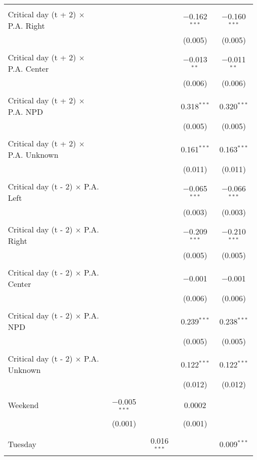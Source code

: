 \documentclass[
]{article}
\begin{document}
\begin{table}[!htbp]
{\begin{tabular}{@{\extracolsep{5pt}}lcccc}
  & & & & \\ 
 Critical day (t + 2) $\times$ P.A. Right &  &  & $-$0.162$^{***}$ & $-$0.160$^{***}$ \\ 
  &  &  & (0.005) & (0.005) \\ 
  & & & & \\ 
 Critical day (t + 2) $\times$ P.A. Center &  &  & $-$0.013$^{**}$ & $-$0.011$^{**}$ \\ 
  &  &  & (0.006) & (0.006) \\ 
  & & & & \\ 
 Critical day (t + 2) $\times$ P.A. NPD &  &  & 0.318$^{***}$ & 0.320$^{***}$ \\ 
  &  &  & (0.005) & (0.005) \\ 
  & & & & \\ 
 Critical day (t + 2) $\times$ P.A. Unknown &  &  & 0.161$^{***}$ & 0.163$^{***}$ \\ 
  &  &  & (0.011) & (0.011) \\ 
  & & & & \\ 
 Critical day (t - 2) $\times$ P.A. Left &  &  & $-$0.065$^{***}$ & $-$0.066$^{***}$ \\ 
  &  &  & (0.003) & (0.003) \\ 
  & & & & \\ 
 Critical day (t - 2) $\times$ P.A. Right &  &  & $-$0.209$^{***}$ & $-$0.210$^{***}$ \\ 
  &  &  & (0.005) & (0.005) \\ 
  & & & & \\ 
 Critical day (t - 2) $\times$ P.A. Center &  &  & $-$0.001 & $-$0.001 \\ 
  &  &  & (0.006) & (0.006) \\ 
  & & & & \\ 
 Critical day (t - 2) $\times$ P.A. NPD &  &  & 0.239$^{***}$ & 0.238$^{***}$ \\ 
  &  &  & (0.005) & (0.005) \\ 
  & & & & \\ 
 Critical day (t - 2) $\times$ P.A. Unknown &  &  & 0.122$^{***}$ & 0.122$^{***}$ \\ 
  &  &  & (0.012) & (0.012) \\ 
  & & & & \\ 
 Weekend & $-$0.005$^{***}$ &  & 0.0002 &  \\ 
  & (0.001) &  & (0.001) &  \\ 
  & & & & \\ 
 Tuesday &  & 0.016$^{***}$ &  & 0.009$^{***}$ \\ 

\end{tabular}}
\end{table}
\end{document}
